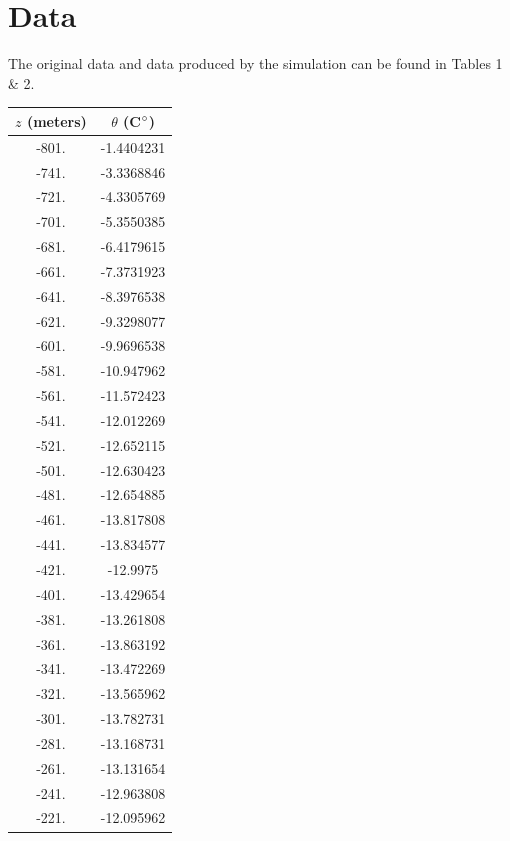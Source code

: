 \documentclass{article}%
\begin{document}
    \section{Data}
    The original data and data produced by the simulation can be found in Tables 1 \& 2. 
    \begin{table}[h!]
        \centering
        \begin{tabular}{c|c}
            $z$ (meters) & $\theta$ (C$\degree$)\\
            \hline
            -801. &  -1.4404231\\
            -741. &  -3.3368846\\
            -721. &  -4.3305769\\
            -701. &  -5.3550385\\
            -681. &  -6.4179615\\
            -661. &  -7.3731923\\
            -641. &  -8.3976538\\
            -621. &  -9.3298077\\
            -601. &  -9.9696538\\
            -581. & -10.947962 \\
            -561. & -11.572423 \\
            -541. & -12.012269 \\
            -521. & -12.652115 \\
            -501. & -12.630423 \\
            -481. & -12.654885 \\
            -461. & -13.817808 \\
            -441. & -13.834577 \\
            -421. & -12.9975   \\
            -401. & -13.429654 \\
            -381. & -13.261808 \\
            -361. & -13.863192 \\
            -341. & -13.472269 \\
            -321. & -13.565962 \\
            -301. & -13.782731 \\
            -281. & -13.168731 \\
            -261. & -13.131654 \\
            -241. & -12.963808 \\
            -221. & -12.095962 \\

\end{tabular}
\end{table}
\end{document}
